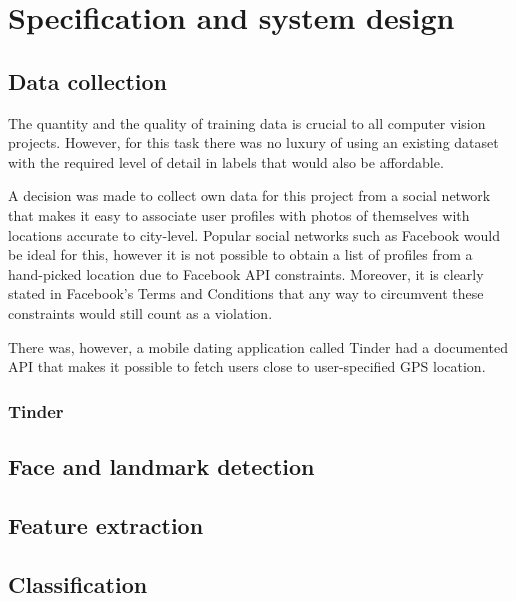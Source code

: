 \chapter{Specification and system design}
\label{spec}
\section{Data collection}
The quantity and the quality of training data is crucial to all computer vision projects. 
However, for this task there was no luxury of using an existing dataset with 
the required level of detail in labels that would also be affordable.

A decision was made to collect own data for this project from a social network that 
makes it easy to associate user profiles with photos of themselves with locations accurate to city-level.
Popular social networks such as Facebook would be ideal for this, however it is not possible to obtain 
a list of profiles from a hand-picked location due to Facebook API constraints. Moreover, it is clearly 
stated in Facebook's Terms and Conditions that any way to circumvent these constraints would still count as a violation.

There was, however, a mobile dating application called Tinder had a documented API that makes it possible to fetch users 
close to user-specified GPS location.

\subsection{Tinder}

\section{Face and landmark detection}

\section{Feature extraction}

\section{Classification}

